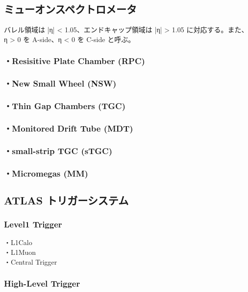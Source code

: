 \subsection{ミューオンスペクトロメータ}
\label{section2-2-4}
バレル領域は |η| < 1.05、エンドキャップ領域は |η| > 1.05
に対応する。また、η > 0 を A-side、η < 0 を C-side と呼ぶ。

\subsubsection{・Resisitive Plate Chamber (RPC)}
\subsubsection{・New Small Wheel (NSW)}
\subsubsection{・Thin Gap Chambers (TGC)}
\subsubsection{・Monitored Drift Tube (MDT)}
\subsubsection{・small-strip TGC (sTGC)}
\subsubsection{・Micromegas (MM)}


\subsection{ATLAS トリガーシステム}
\subsubsection{Level1 Trigger}
・L1Calo\\
・L1Muon\\
・Central Trigger
\subsubsection{High-Level Trigger}






